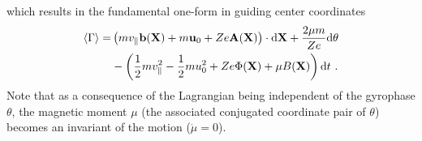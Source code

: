 which results in the fundamental one-form in guiding center coordinates
\begin{gather}
    \begin{aligned}
        \langle \Gamma \rangle =  &\left(m v_\parallel \boldsymbol{\mathbf{b}}(\boldsymbol{\mathbf{X}}) + m\boldsymbol{\mathbf{u}}_0 + Ze\boldsymbol{\mathbf{A}}(\boldsymbol{\mathbf{X}})\right) \cdot \mathrm{d}\boldsymbol{\mathbf{X}} + \frac{2\mu m}{Ze} \mathrm{d}\theta \\
                                  &- \left(\frac{1}{2}mv_\parallel^2 - \frac{1}{2}mu_0^2 + Ze\Phi(\boldsymbol{\mathbf{X}}) + \mu B(\boldsymbol{\mathbf{X}}) \right) \mathrm{d}t~.
    \end{aligned}
    \label{eq:guidingcenterLagrangian}
\end{gather}
Note that as a consequence of the Lagrangian being independent of the gyrophase $\theta$, the magnetic moment $\mu$ (the associated conjugated coordinate pair of $\theta$) becomes an invariant of the motion ($\dot{\mu} = 0$). \bigskip

